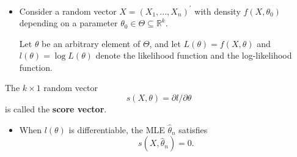 \documentclass[notes=show]{beamer}
\begin{document}
\begin{frame}%


\begin{itemize}
\item Consider a random vector $X=\left( X_{1},...,X_{n}\right) ^{\prime }$
with density $f\left( X,\theta _{0}\right) $ depending on a parameter $%
\theta _{0}\in \Theta \subseteq \mathbb{R}^{k}$.

Let $\theta $ be an arbitrary element of $\Theta $, and let $L\left( \theta
\right) =f\left( X,\theta \right) $ and $l\left( \theta \right) =\log
L\left( \theta \right) $ denote the likelihood function and the
log-likelihood function.
\end{itemize}

\begin{definition}
The $k\times 1$ random vector 
\begin{equation*}
s\left( X,\theta \right) =\partial l/\partial \theta 
\end{equation*}%
is called the \textbf{score vector}.
\end{definition}

\begin{itemize}
\item When $l\left( \theta \right) $ is differentiable, the MLE $\hat{\theta}%
_{n}$ satisfies 
\begin{equation}
s\left( X,\hat{\theta}_{n}\right) =0.  \label{2.12}
\end{equation}
\end{itemize}

\end{frame}%
\end{document}
